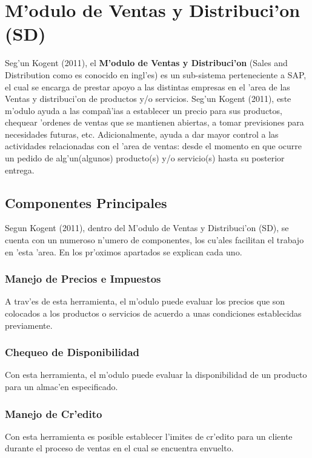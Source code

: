 \section{M'odulo de Ventas y Distribuci'on (SD)} \label{sect:sd}

Seg'un Kogent (2011), el \textbf{M'odulo de Ventas y Distribuci'on} (Sales and Distribution como es conocido en ingl'es) es un sub-sistema perteneciente a SAP, el cual se encarga de prestar apoyo a las distintas empresas en el 'area de las Ventas y distribuci'on de productos y/o servicios. 
\newline
\newline
\indent Seg'un Kogent (2011), este m'odulo ayuda a las compa\~n'ias a establecer un precio para sus productos, chequear 'ordenes de ventas que se mantienen abiertas, a tomar previsiones para necesidades futuras, etc. Adicionalmente, ayuda a dar mayor control a las actividades relacionadas con el 'area de ventas: desde el momento en que ocurre un pedido de alg'un(algunos) producto(s) y/o servicio(s) hasta su posterior entrega.



\subsection{Componentes Principales}
	Segun Kogent (2011), dentro del M'odulo de Ventas y Distribuci'on (SD), se cuenta con un numeroso n'umero de componentes, los cu'ales facilitan el trabajo en 'esta 'area. En los pr'oximos apartados se explican cada uno.
\subsubsection{Manejo de Precios e Impuestos}
A trav'es de esta herramienta, el m'odulo puede evaluar los precios que son colocados a los productos o servicios de acuerdo a unas condiciones establecidas previamente. 
\subsubsection{Chequeo de Disponibilidad}
Con esta herramienta, el m'odulo puede evaluar la disponibilidad de un producto para un almac'en especificado.
\subsubsection{Manejo de Cr'edito}
Con esta herramienta es posible establecer l'imites de cr'edito para un cliente durante el proceso de ventas en el cual se encuentra envuelto.
